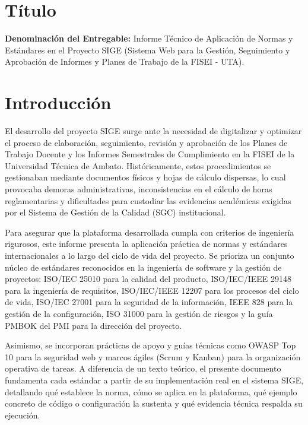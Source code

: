 \documentclass[12pt,a4paper]{article}
\begin{document}

\vspace{0.25cm}
\section{Título}
\textbf{Denominación del Entregable:} Informe Técnico de Aplicación de Normas y Estándares en el Proyecto SIGE (Sistema Web para la Gestión, Seguimiento y Aprobación de Informes y Planes de Trabajo de la FISEI - UTA).



\section{Introducción}
El desarrollo del proyecto SIGE surge ante la necesidad de digitalizar y optimizar el proceso de elaboración, seguimiento, revisión y aprobación de los Planes de Trabajo Docente y los Informes Semestrales de Cumplimiento en la FISEI de la Universidad Técnica de Ambato. Históricamente, estos procedimientos se gestionaban mediante documentos físicos y hojas de cálculo dispersas, lo cual provocaba demoras administrativas, inconsistencias en el cálculo de horas reglamentarias y dificultades para custodiar las evidencias académicas exigidas por el Sistema de Gestión de la Calidad (SGC) institucional.

Para asegurar que la plataforma desarrollada cumpla con criterios de ingeniería rigurosos, este informe presenta la aplicación práctica de normas y estándares internacionales a lo largo del ciclo de vida del proyecto. Se prioriza un conjunto núcleo de estándares reconocidos en la ingeniería de software y la gestión de proyectos: ISO/IEC 25010 para la calidad del producto, ISO/IEC/IEEE 29148 para la ingeniería de requisitos, ISO/IEC/IEEE 12207 para los procesos del ciclo de vida, ISO/IEC 27001 para la seguridad de la información, IEEE 828 para la gestión de la configuración, ISO 31000 para la gestión de riesgos y la guía PMBOK del PMI para la dirección del proyecto.

Asimismo, se incorporan prácticas de apoyo y guías técnicas como OWASP Top 10 para la seguridad web y marcos ágiles (Scrum y Kanban) para la organización operativa de tareas. A diferencia de un texto teórico, el presente documento fundamenta cada estándar a partir de su implementación real en el sistema SIGE, detallando qué establece la norma, cómo se aplica en la plataforma, qué ejemplo concreto de código o configuración la sustenta y qué evidencia técnica respalda su ejecución.
\end{document}
